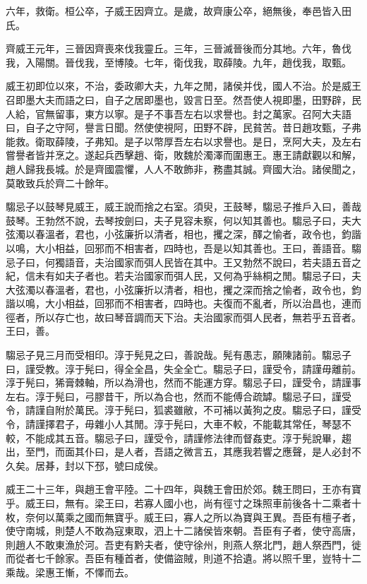 六年，救衛。桓公卒，子威王因齊立。是歲，故齊康公卒，絕無後，奉邑皆入田氏。

齊威王元年，三晉因齊喪來伐我靈丘。三年，三晉滅晉後而分其地。六年，魯伐我，入陽關。晉伐我，至博陵。七年，衛伐我，取薛陵。九年，趙伐我，取甄。

威王初即位以來，不治，委政卿大夫，九年之閒，諸侯并伐，國人不治。於是威王召即墨大夫而語之曰，自子之居即墨也，毀言日至。然吾使人視即墨，田野辟，民人給，官無留事，東方以寧。是子不事吾左右以求譽也。封之萬家。召阿大夫語曰，自子之守阿，譽言日聞。然使使視阿，田野不辟，民貧苦。昔日趙攻甄，子弗能救。衛取薛陵，子弗知。是子以幣厚吾左右以求譽也。是日，烹阿大夫，及左右嘗譽者皆并烹之。遂起兵西擊趙、衛，敗魏於濁澤而圍惠王。惠王請獻觀以和解，趙人歸我長城。於是齊國震懼，人人不敢飾非，務盡其誠。齊國大治。諸侯聞之，莫敢致兵於齊二十餘年。

騶忌子以鼓琴見威王，威王說而捨之右室。須臾，王鼓琴，騶忌子推戶入曰，善哉鼓琴。王勃然不說，去琴按劍曰，夫子見容未察，何以知其善也。騶忌子曰，夫大弦濁以春溫者，君也，小弦廉折以清者，相也，攫之深，醳之愉者，政令也，鈞諧以鳴，大小相益，回邪而不相害者，四時也，吾是以知其善也。王曰，善語音。騶忌子曰，何獨語音，夫治國家而弭人民皆在其中。王又勃然不說曰，若夫語五音之紀，信未有如夫子者也。若夫治國家而弭人民，又何為乎絲桐之閒。騶忌子曰，夫大弦濁以春溫者，君也，小弦廉折以清者，相也，攫之深而捨之愉者，政令也，鈞諧以鳴，大小相益，回邪而不相害者，四時也。夫復而不亂者，所以治昌也，連而徑者，所以存亡也，故曰琴音調而天下治。夫治國家而弭人民者，無若乎五音者。王曰，善。

騶忌子見三月而受相印。淳于髡見之曰，善說哉。髡有愚志，願陳諸前。騶忌子曰，謹受教。淳于髡曰，得全全昌，失全全亡。騶忌子曰，謹受令，請謹毋離前。淳于髡曰，狶膏棘軸，所以為滑也，然而不能運方穿。騶忌子曰，謹受令，請謹事左右。淳于髡曰，弓膠昔干，所以為合也，然而不能傅合疏罅。騶忌子曰，謹受令，請謹自附於萬民。淳于髡曰，狐裘雖敝，不可補以黃狗之皮。騶忌子曰，謹受令，請謹擇君子，毋雜小人其閒。淳于髡曰，大車不較，不能載其常任，琴瑟不較，不能成其五音。騶忌子曰，謹受令，請謹修法律而督姦吏。淳于髡說畢，趨出，至門，而面其仆曰，是人者，吾語之微言五，其應我若響之應聲，是人必封不久矣。居朞，封以下邳，號曰成侯。

威王二十三年，與趙王會平陸。二十四年，與魏王會田於郊。魏王問曰，王亦有寶乎。威王曰，無有。梁王曰，若寡人國小也，尚有徑寸之珠照車前後各十二乘者十枚，奈何以萬乘之國而無寶乎。威王曰，寡人之所以為寶與王異。吾臣有檀子者，使守南城，則楚人不敢為寇東取，泗上十二諸侯皆來朝。吾臣有子者，使守高唐，則趙人不敢東漁於河。吾吏有黔夫者，使守徐州，則燕人祭北門，趙人祭西門，徙而從者七千餘家。吾臣有種首者，使備盜賊，則道不拾遺。將以照千里，豈特十二乘哉。梁惠王慚，不懌而去。

